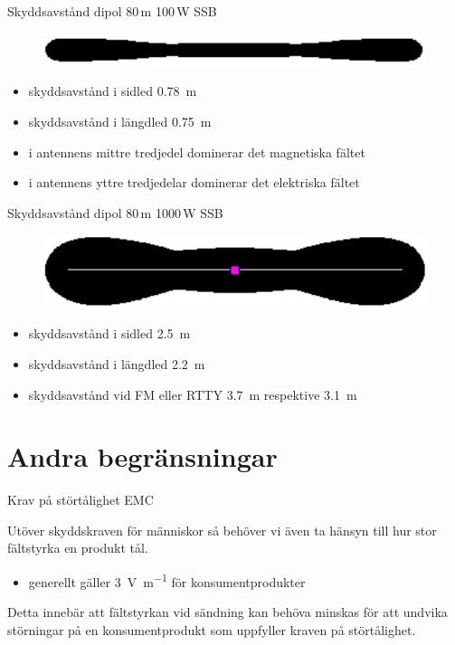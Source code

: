 \documentclass{beamer}
\begin{document}
\begin{frame}{Skyddsavstånd dipol 80\,m 100\,W SSB}

\begin{figure}[h]
\includegraphics[width=\textwidth]{images/Dip_80m_100W_SSB_E_H_guard_area.pdf}
\end{figure}

\begin{itemize}
  \item skyddsavstånd i sidled \SI{0,78}{\meter}
  \item skyddsavstånd i längdled \SI{0,75}{\meter}
  \item i antennens mittre tredjedel dominerar det magnetiska fältet
  \item i antennens yttre tredjedelar dominerar det elektriska fältet
\end{itemize}
\end{frame}

\begin{frame}{Skyddsavstånd dipol 80\,m 1000\,W SSB}

\begin{figure}[h]
	\includegraphics[width=\textwidth]{images/Dip_80m_1000W_SSB_E_H_guard_area.pdf}
\end{figure}

\begin{itemize}
	\item skyddsavstånd i sidled \SI{2,5}{\meter}
	\item skyddsavstånd i längdled \SI{2,2}{\meter}
	\item skyddsavstånd vid FM eller RTTY \SI{3,7}{\meter} respektive \SI{3,1}{\meter}
\end{itemize}
\end{frame}

\section{Andra begränsningar}

\begin{frame}{Krav på störtålighet EMC}

Utöver skyddskraven för människor så behöver vi även ta hänsyn till hur stor
fältstyrka en produkt tål.
\begin{itemize}
	\item generellt gäller \SI{3}{\volt\per\meter} för konsumentprodukter
\end{itemize}
Detta innebär att fältstyrkan vid sändning kan behöva minskas för att undvika
störningar på en konsumentprodukt som uppfyller kraven på störtålighet.
\end{frame}
\end{document}
